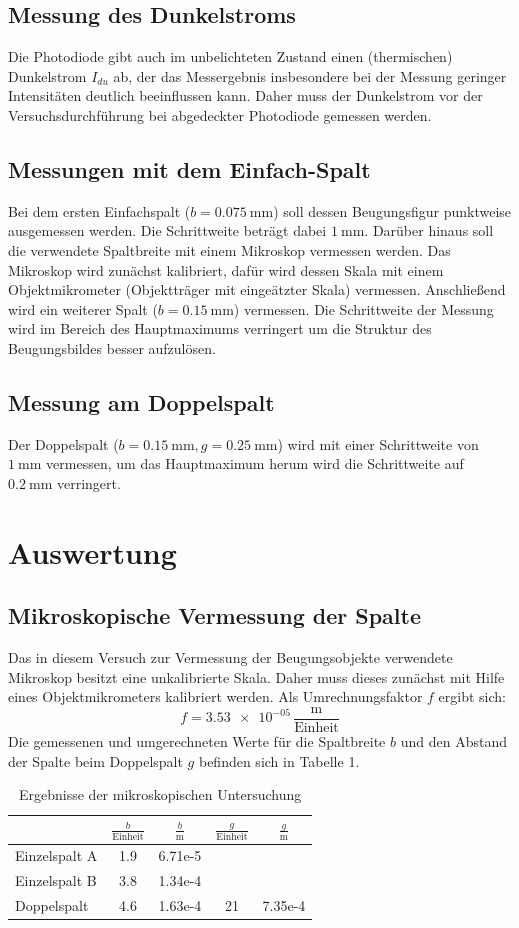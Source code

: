 \documentclass[11pt,ngerman,a4paper]{article}
\begin{document}
\subsection{Messung des Dunkelstroms}
Die Photodiode gibt auch im unbelichteten Zustand einen (thermischen) Dunkelstrom $I_{du}$ ab, der das Messergebnis insbesondere bei der Messung geringer Intensitäten deutlich beeinflussen kann. Daher muss der Dunkelstrom vor der Versuchsdurchführung bei abgedeckter Photodiode gemessen werden.
\subsection{Messungen mit dem Einfach-Spalt}
Bei dem ersten Einfachspalt ($b=\SI{0.075}{\milli \meter}$) soll dessen Beugungsfigur punktweise ausgemessen werden. Die Schrittweite beträgt dabei $\SI{1}{\milli \meter}$. Darüber hinaus soll die verwendete Spaltbreite mit einem Mikroskop vermessen werden. Das Mikroskop wird zunächst kalibriert, dafür wird dessen Skala mit einem Objektmikrometer (Objektträger mit eingeätzter Skala) vermessen.
\newline
Anschließend wird ein weiterer Spalt ($b=\SI{0.15}{\milli \meter}$) vermessen. Die Schrittweite der Messung wird im Bereich des Hauptmaximums verringert um die Struktur des Beugungsbildes besser aufzulösen.  
\subsection{Messung am Doppelspalt}
Der Doppelspalt ($b=\SI{0.15}{\milli \meter}, g=\SI{0.25}{\milli \meter}$) wird mit einer Schrittweite von $\SI{1}{\milli \meter}$ vermessen, um das Hauptmaximum herum wird die Schrittweite auf $\SI{0.2}{\milli \meter}$ verringert.
\section{Auswertung}
\subsection{Mikroskopische Vermessung der Spalte}
Das in diesem Versuch zur Vermessung der Beugungsobjekte verwendete Mikroskop besitzt eine unkalibrierte Skala. Daher muss dieses zunächst mit Hilfe eines Objektmikrometers kalibriert werden. Als Umrechnungsfaktor $f$ ergibt sich:
\[
f = \num{3.53e-05}\,\frac{\si{\meter}}{\mathrm{Einheit}}
\]
Die gemessenen und umgerechneten Werte für die Spaltbreite $b$ und den Abstand der Spalte beim Doppelspalt $g$ befinden sich in Tabelle 1.
\begin{table}[H]
\centering
\begin{tabular}{lSSSS}

\toprule
&$\frac{b}{\mathrm{Einheit}}$ & $\frac{b}{\si{\meter}}$ & $\frac{g}{\mathrm{Einheit}}$ &$\frac{g}{\si{\meter}}$\\
\midrule
Einzelspalt A & 1.9 &6.71e-5 & &\\
Einzelspalt B & 3.8 &1.34e-4 &&\\
Doppelspalt & 4.6 & 1.63e-4&21&7.35e-4\\
\bottomrule
\end{tabular}
\caption{Ergebnisse der mikroskopischen Untersuchung}
\end{table}
\end{document}
